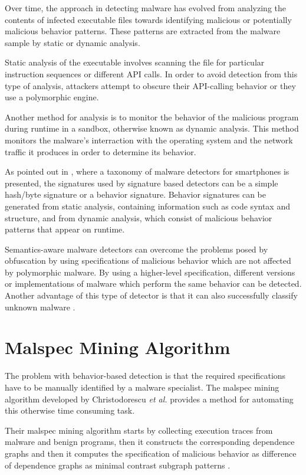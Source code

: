 Over time, the approach in detecting malware has evolved from analyzing the contents of infected executable files towards identifying malicious or potentially malicious behavior patterns. These patterns are extracted from the malware sample by static or dynamic analysis.

Static analysis of the executable involves scanning the file for particular instruction sequences or different API calls. In order to avoid detection from this type of analysis, attackers attempt to obscure their API-calling behavior or they use a polymorphic engine.

Another method for analysis is to monitor the behavior of the malicious program during runtime in a sandbox, otherwise known as dynamic analysis. This method monitors the malware's interraction with the operating system and the network traffic it produces in order to determine its behavior.

As pointed out in \cite{smartphone-malware-detection}, where a taxonomy of malware detectors for smartphones is presented, the signatures used by signature based detectors can be a simple hash/byte signature or a behavior signature. Behavior signatures can be generated from static analysis, containing information such as code syntax and structure, and from dynamic analysis, which consist of malicious behavior patterns that appear on runtime.

Semantics-aware malware detectors can overcome the problems posed by obfuscation by using specifications of malicious behavior which are not affected by polymorphic malware. By using a higher-level specification, different versions or implementations of malware which perform the same behavior can be detected. Another advantage of this type of detector is that it can also successfully classify unknown malware \cite{semantics-based-detection}.

\section{Malspec Mining Algorithm}
\label{sec:malspec-alg}

The problem with behavior-based detection is that the required specifications have to be manually identified by a malware specialist. The malspec mining algorithm developed by Christodorescu \textit{et al.} \cite{mining-specifications} provides a method for automating this otherwise time consuming task. 

Their malspec mining algorithm starts by collecting execution traces from malware and benign programs, then it constructs the corresponding dependence graphs and then it computes the specification of malicious behavior as difference of dependence graphs as minimal contrast subgraph patterns \cite{minimal-contrast-subgraph}.

